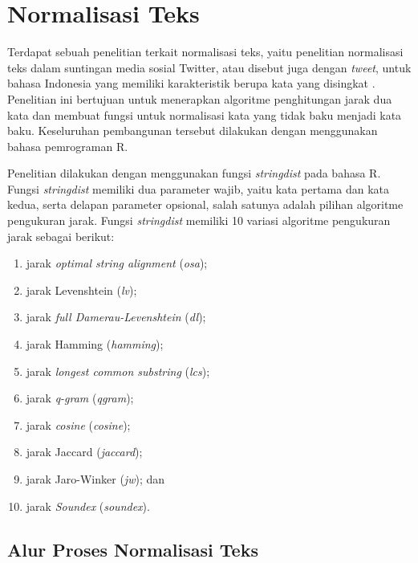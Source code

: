 \section{Normalisasi Teks}

Terdapat sebuah penelitian terkait normalisasi teks, yaitu penelitian normalisasi teks dalam suntingan media sosial Twitter, atau disebut juga dengan \textit{tweet}, untuk bahasa Indonesia yang memiliki karakteristik berupa kata yang disingkat \parencite{saragih2017normalisasi}. Penelitian ini bertujuan untuk menerapkan algoritme penghitungan jarak dua kata dan membuat fungsi untuk normalisasi kata yang tidak baku menjadi kata baku. Keseluruhan pembangunan tersebut dilakukan dengan menggunakan bahasa pemrograman R.

Penelitian dilakukan dengan menggunakan fungsi \textit{stringdist} pada bahasa R. Fungsi \textit{stringdist} memiliki dua parameter wajib, yaitu kata pertama dan kata kedua, serta delapan parameter opsional, salah satunya adalah pilihan algoritme pengukuran jarak. Fungsi \textit{stringdist} memiliki 10 variasi algoritme pengukuran jarak sebagai berikut:
\begin{enumerate}
	\item jarak \textit{optimal string alignment} (\textit{osa});
	\item jarak Levenshtein (\textit{lv});
	\item jarak \textit{full Damerau-Levenshtein} (\textit{dl});
	\item jarak Hamming (\textit{hamming});
	\item jarak \textit{longest common substring} (\textit{lcs});
	\item jarak \textit{q-gram} (\textit{qgram});
	\item jarak \textit{cosine} (\textit{cosine});
	\item jarak Jaccard (\textit{jaccard});
	\item jarak Jaro-Winker (\textit{jw}); dan
	\item jarak \textit{Soundex} (\textit{soundex}).
\end{enumerate}

\subsection{Alur Proses Normalisasi Teks}

